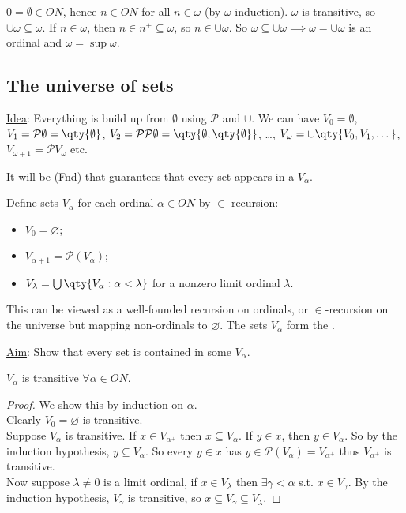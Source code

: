 \begin{example}
    $0 = \emptyset \in ON$, hence $n \in ON$ for all $n \in \omega$ (by $\omega$-induction).
    $\omega$ is transitive, so $\cup \omega \subseteq \omega$.
    If $n \in \omega$, then $n \in n^+ \subseteq \omega$, so $n \in \cup \omega$.
    So $\omega \subseteq \cup \omega \implies \omega = \cup \omega$ is an ordinal and $\omega = \sup \omega$.
\end{example}

\subsection{The universe of sets}

\underline{Idea}: Everything is build up from $\emptyset$ using $\mathcal{P}$ and $\cup$.
We can have $V_0 = \emptyset$, $V_1 = \mathcal{P} \emptyset = \qty{\emptyset}$, $V_2 = \mathcal{P} \mathcal{P} \emptyset = \qty{\emptyset, \qty{\emptyset}}$, \dots, $V_\omega = \cup \qty{V_0, V_1, \dots}$, $V_{\omega + 1} = \mathcal{P} V_\omega$ etc.

It will be (Fnd) that guarantees that every set appears in a $V_\alpha$.

Define sets $V_\alpha$ for each ordinal $\alpha \in ON$ by $\in$-recursion:
\begin{itemize}
    \item $V_0 = \varnothing$;
    \item $V_{\alpha+1} = \mathcal P(V_\alpha)$;
    \item $V_\lambda = \bigcup \qty{V_\alpha : \alpha < \lambda}$ for a nonzero limit ordinal $\lambda$.
\end{itemize}
This can be viewed as a well-founded recursion on ordinals, or $\in$-recursion on the universe but mapping non-ordinals to $\varnothing$.
The sets $V_\alpha$ form the .

\underline{Aim}: Show that every set is contained in some $V_\alpha$.

\begin{lemma} \label{lem:5-6}
    $V_\alpha$ is transitive $\forall \alpha \in ON$.
\end{lemma}

\begin{proof}
    We show this by induction on $\alpha$. \\
    Clearly $V_0 = \varnothing$ is transitive. \\
    Suppose $V_\alpha$ is transitive.
    If $x \in V_{\alpha^+}$ then $x \subseteq V_\alpha$.
    If $y \in x$, then $y \in V_\alpha$.
    So by the induction hypothesis, $y \subseteq V_\alpha$.
    So every $y \in x$ has $y \in \mathcal{P}(V_\alpha) = V_{\alpha^+}$ thus $V_{\alpha^+}$ is transitive. \\
    Now suppose $\lambda \neq 0$ is a limit ordinal, if $x \in V_\lambda$ then $\exists \gamma < \alpha$ s.t. $x \in V_\gamma$.
    By the induction hypothesis, $V_\gamma$ is transitive, so $x \subseteq V_\gamma \subseteq V_\lambda$.
\end{proof}

